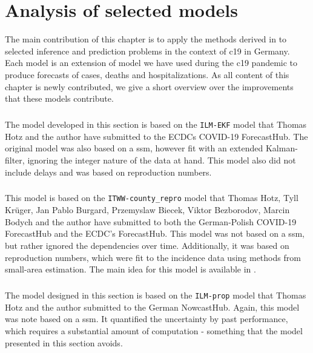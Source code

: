 \chapter{Analysis of selected models}
\label{cha:analysis_of_selected_models}
\newpage
\begin{tcolorbox}[title={Contributions of this chapter}]
    The main contribution of this chapter is to apply the methods derived in  to selected inference and prediction problems in the context of \acrshort{c19} in Germany. Each model is an extension of model we have used during the \acrshort{c19} pandemic to produce forecasts of cases, deaths and hospitalizations. As all content of this chapter is newly contributed, we give a short overview over the improvements that these models contribute.

    \paragraph{}
    The model developed in this section is based on the \texttt{ILM-EKF} model that Thomas Hotz and the author have submitted to the ECDCs COVID-19 ForecastHub. The original model was also based on a \acrshort{ssm}, however fit with an extended Kalman-filter, ignoring the integer nature of the data at hand. This model also did not include delays and was based on reproduction numbers.

    \paragraph{}
    This model is based on the \texttt{ITWW-county\_repro} model that Thomas Hotz, Tyll Krüger, Jan Pablo Burgard, Przemyslaw Biecek, Viktor Bezborodov, Marcin Bodych and the author have submitted to both the German-Polish COVID-19 ForecastHub and the ECDC's ForecastHub. This model was not based on a \acrshort{ssm}, but rather ignored the dependencies over time. Additionally, it was based on reproduction numbers, which were fit to the incidence data using methods from small-area estimation. The main idea for this model is available in \citep{Heyder2022Regional}.

    \paragraph{}
    The model designed in this section is based on the \texttt{ILM-prop} model that Thomas Hotz and the author submitted to the German NowcastHub. Again, this model was note based on a \acrshort{ssm}. It quantified the uncertainty by past performance, which requires a substantial amount of computation - something that the model presented in this section avoids.
\end{tcolorbox}
